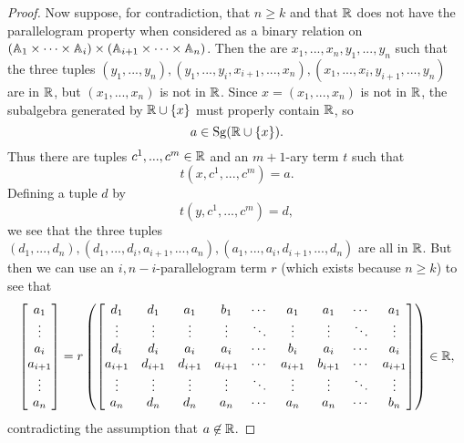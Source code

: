 \documentclass[letterpaper,11pt]{article}
\DeclareMathOperator{\Sg}{Sg}
\begin{document}
\begin{proof}
Now suppose, for contradiction, that $n \ge k$ and that $\mathbb{R}$ does not have the parallelogram property when considered as a binary relation on $(\mathbb{A}_1 \times \cdots \times \mathbb{A}_i)\times (\mathbb{A}_{i+1} \times \cdots \times \mathbb{A}_n)$. Then the are $x_1, ..., x_n, y_1, ..., y_n$ such that the three tuples $(y_1, ..., y_n), (y_1, ..., y_i, x_{i+1}, ..., x_n), (x_1, ..., x_i, y_{i+1}, ..., y_n)$ are in $\mathbb{R}$, but $(x_1, ..., x_n)$ is not in $\mathbb{R}$. Since $x = (x_1, ..., x_n)$ is not in $\mathbb{R}$, the subalgebra generated by $\mathbb{R} \cup \{x\}$ must properly contain $\mathbb{R}$, so
\[
a \in \Sg(\RR \cup \{x\}).
\]
Thus there are tuples $c^1, ..., c^m \in \mathbb{R}$ and an $m+1$-ary term $t$ such that
\[
t(x,c^1, ..., c^m) = a.
\]
Defining a tuple $d$ by
\[
t(y,c^1,..., c^m) = d,
\]
we see that the three tuples $(d_1, ..., d_n), (d_1, ..., d_i, a_{i+1}, ..., a_n), (a_1, ..., a_i, d_{i+1}, ..., d_n)$ are all in $\mathbb{R}$. But then we can use an $i, n-i$-parallelogram term $r$ (which exists because $n \ge k$) to see that
\[
\begin{bmatrix} a_1\\ \vdots\\ a_i\\ a_{i+1}\\ \vdots\\ a_n \end{bmatrix} = r\left(\begin{bmatrix} d_1 & d_1 & a_1 & b_1 & \cdots & a_1 & a_1 & \cdots & a_1\\ \vdots & \vdots & \vdots & \vdots & \ddots & \vdots & \vdots & \ddots & \vdots\\ d_i & d_i & a_i & a_i & \cdots & b_i & a_i & \cdots & a_i\\ a_{i+1} & d_{i+1} & d_{i+1} & a_{i+1} & \cdots & a_{i+1} & b_{i+1} & \cdots & a_{i+1}\\ \vdots & \vdots & \vdots & \vdots & \ddots & \vdots & \vdots & \ddots & \vdots\\ a_n & d_n & d_n & a_n & \cdots & a_n & a_n & \cdots & b_n \end{bmatrix}\right) \in \mathbb{R},
\]
contradicting the assumption that $a \not\in \mathbb{R}$.


\end{proof}
\end{document}
